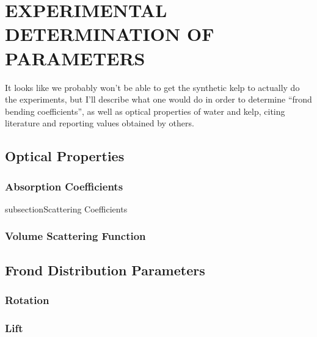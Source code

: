 \chapter{EXPERIMENTAL DETERMINATION OF PARAMETERS} \label{ch:experiment}

It looks like we probably won't be able to get the synthetic kelp to actually do
the experiments, but I'll describe what one would do in order to determine
``frond bending coefficients'', as well as optical properties of water and kelp,
citing literature and reporting values obtained by others.

\section{Optical Properties}
\subsection{Absorption Coefficients}
subsection{Scattering Coefficients}
\subsection{Volume Scattering Function}

\section{Frond Distribution Parameters}
\subsection{Rotation}
\subsection{Lift}
